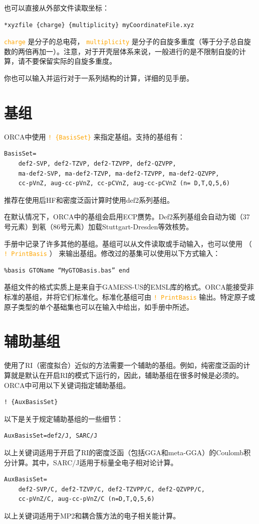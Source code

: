 \documentclass{ctexart}
\newcommand{\cmd}[1]{ \textcolor{orange}{\texttt{#1}} }
\begin{document}
	也可以直接从外部文件读取坐标：
	\begin{lstlisting}
*xyzfile {charge} {multiplicity} myCoordinateFile.xyz
	\end{lstlisting}
	
	\cmd{charge}是分子的总电荷，\cmd{multiplicity}是分子的自旋多重度（等于分子总自旋数的两倍再加一）。注意，对于开壳层体系来说，一般进行的是不限制自旋的计算，请不要保留实际的自旋多重度。
	
	你也可以输入并运行对于一系列结构的计算，详细的见手册。
	
	\section{基组}
	ORCA中使用\cmd{! \{BasisSet\}}来指定基组。支持的基组有：
	\begin{lstlisting}
BasisSet= 
	def2-SVP, def2-TZVP, def2-TZVPP, def2-QZVPP,
	ma-def2-SVP, ma-def2-TZVP, ma-def2-TZVPP, ma-def2-QZVPP,
	cc-pVnZ, aug-cc-pVnZ, cc-pCVnZ, aug-cc-pCVnZ (n= D,T,Q,5,6)
	\end{lstlisting}
	
	推荐在使用后HF和密度泛函计算时使用def2系列基组。
	
	在默认情况下，ORCA中的基组会启用ECP赝势。Def2系列基组会自动为铷（37号元素）到氡（86号元素）加载Stuttgart-Dresden等效核势。
	
	手册中记录了许多其他的基组。基组可以从文件读取或手动输入，也可以使用 （\cmd{! PrintBasis}） 来输出基组。修改过的基集可以使用以下方式输入：
	\begin{lstlisting}
%basis GTOName “MyGTOBasis.bas” end
	\end{lstlisting}
	
	基组文件的格式实质上是来自于GAMESS-US的EMSL库的格式。ORCA能接受非标准的基组，并将它们标准化。标准化基组可由\cmd{! PrintBasis}输出。特定原子或原子类型的单个基础集也可以在输入中给出，如手册中所述。
	
	\section{辅助基组}
	使用了RI（密度拟合）近似的方法需要一个辅助的基组。例如，纯密度泛函的计算就是默认在开启RI的模式下运行的，因此，辅助基组在很多时候是必须的。ORCA中可用以下关键词指定辅助基组。
	\begin{lstlisting}
! {AuxBasisSet}
	\end{lstlisting}
	
	以下是关于规定辅助基组的一些细节：
	
	\begin{lstlisting}
AuxBasisSet=def2/J, SARC/J
	\end{lstlisting}
	以上关键词适用于开启了RI的密度泛函（包括GGA和meta-GGA）的Coulomb积分计算。其中，SARC/J适用于标量全电子相对论计算。
	\begin{lstlisting}
AuxBasisSet= 
	def2-SVP/C, def2-TZVP/C, def2-TZVPP/C, def2-QZVPP/C, 
	cc-pVnZ/C, aug-cc-pVnZ/C (n=D,T,Q,5,6)
	\end{lstlisting}
	以上关键词适用于MP2和耦合簇方法的电子相关能计算。
	
\end{document}
